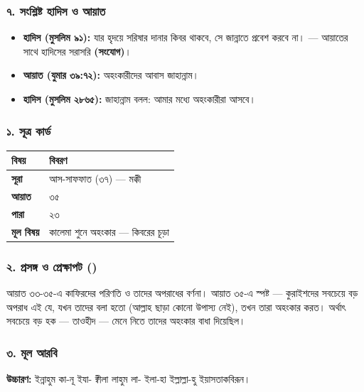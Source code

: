 \subsubsection*{৭. সংশ্লিষ্ট হাদিস ও আয়াত}

\begin{itemize}
\item \textbf{হাদিস (মুসলিম ৯১):} যার হৃদয়ে সরিষার দানার কিবর থাকবে, সে জান্নাতে প্রবেশ করবে না। — আয়াতের সাথে হাদিসের সরাসরি \textbf{ (সংযোগ)}।
\item \textbf{আয়াত (যুমার ৩৯:৭২):} অহংকারীদের আবাস জাহান্নাম।
\item \textbf{হাদিস (মুসলিম ২৮৬৫):} জাহান্নাম বলল: আমার মধ্যে অহংকারীরা আসবে।
\end{itemize}
\subsubsection*{১. সূত্র কার্ড}

\begin{table}[h]\centering\small
\begin{tabular}{ll}
বিষয় & বিবরণ \\
\hline
\textbf{সূরা} & আস-সাফফাত (৩৭) — মক্কী \\
\textbf{আয়াত} & ৩৫ \\
\textbf{পারা} & ২৩ \\
\textbf{মূল বিষয়} & কালেমা শুনে অহংকার — কিবরের চূড়া \\
\hline
\end{tabular}
\end{table}

\subsubsection*{২. প্রসঙ্গ ও প্রেক্ষাপট ()}

আয়াত ৩৩-৩৫-এ কাফিরদের পরিণতি ও তাদের অপরাধের বর্ণনা। আয়াত ৩৫-এ স্পষ্ট — কুরাইশদের সবচেয়ে বড় অপরাধ এই যে, যখন তাদের বলা হতো     (আল্লাহ ছাড়া কোনো উপাস্য নেই), তখন তারা অহংকার করত। অর্থাৎ সবচেয়ে বড় হক — তাওহীদ — মেনে নিতে তাদের অহংকার বাধা দিয়েছিল।

\subsubsection*{৩. মূল আরবি}
\begin{center}\end{center}
\textbf{উচ্চারণ:} ইন্নাহুম কা-নূ ইযা- ক্বীলা লাহুম লা- ইলা-হা ইল্লাল্লা-হু ইয়াসতাকবিরূন।

